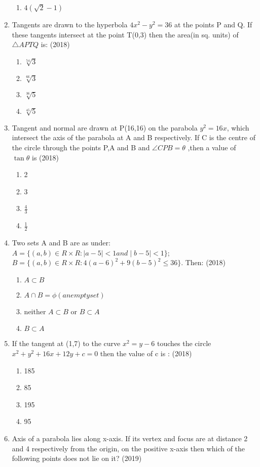 \documentclass[12pt]{article}
\begin{document}
\begin{enumerate}
\begin{enumerate}
\item  $4(\sqrt{2}-1)$
\end{enumerate}
\item Tangents are drawn to the hyperbola $4x^2-y^2=36$ at the points P and Q. If these tangents intersect at the point T(0,3) then the area(in sq. units) of $\triangle APTQ$ is: (2018)
\begin{enumerate}
\item  $\sqrt[54]{3}$
\item  $\sqrt[66]{3}$
\item  $\sqrt[36]{5}$
\item  $\sqrt[45]{5}$
\end{enumerate}
\item Tangent and normal are drawn at P(16,16) on the parabola $y^2=16x$, which intersect the axis of the parabola at A and B respectively. If C is the centre of the circle through the points P,A and B and $\angle CPB=\theta$ ,then a value of $\tan \theta$ is (2018)
\begin{enumerate}
\item  2
\item 3
\item $\frac{4}{3}$
\item $\frac{1}{2}$
\end{enumerate} 
\item Two sets A and B are as under:\\
$A=\{(a,b)\in R\times R:\mid a-5 \mid <1 and \mid b-5 \mid <1 \}$;\\
$B=\{(a,b)\in R\times R:4(a-6)^2+9(b-5)^2\leq 36\}$. Then: (2018)
\begin{enumerate}
\item $A\subset B$
\item $A\cap B=\phi (an empty set)$
\item  neither $A\subset B$ or $B \subset A$
\item $B \subset A$
\end{enumerate} 
\item If the tangent at (1,7) to the curve $x^2=y-6$ touches the circle $x^2+y^2+16x +12y+c=0$ then the value of c is : (2018)
\begin{enumerate}
\item 185
\item 85
\item 195
\item 95
\end{enumerate}
\item Axis of a parabola lies along x-axis. If its vertex and focus are at distance 2 and 4 respectively from the origin, on the positive x-axis then which of the following points does not lie on it? (2019)

\end{enumerate}
\end{document}
